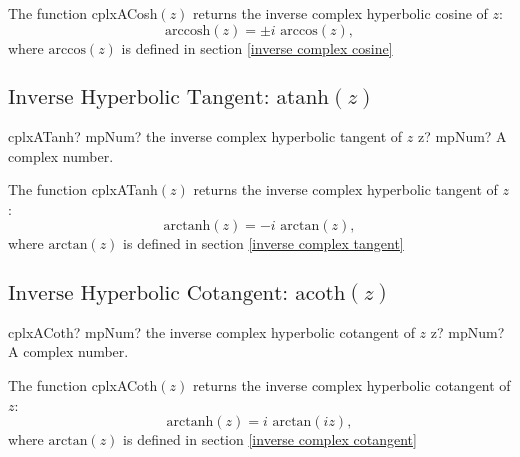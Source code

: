 \vspace{0.3cm}
The function \textsf{cplxACosh$(z)$} returns the inverse complex hyperbolic cosine of $z$: 
\begin{equation}
	\text{arccosh}(z) = \pm i \text{ arccos}(z),
\end{equation}
where $\text{arccos}(z)$ is defined in section \ref{inverse complex cosine}




\newpage
\subsection{\texorpdfstring{$\text{Inverse Hyperbolic Tangent: atanh}(z)$}{atanh}}

\begin{mpFunctionsExtract}
	\mpFunctionOne
	{cplxATanh? mpNum? the inverse complex hyperbolic tangent of $z$}
	{z? mpNum? A complex number.}
\end{mpFunctionsExtract}

\vspace{0.3cm}
The function \textsf{cplxATanh$(z)$} returns the inverse complex hyperbolic tangent of $z$: 
\begin{equation}
	\text{arctanh}(z) = -i \text{ arctan}(z),
\end{equation}
where $\text{arctan}(z)$ is defined in section \ref{inverse complex tangent}






\newpage
\subsection{\texorpdfstring{$\text{Inverse Hyperbolic Cotangent: acoth}(z)$}{acoth}}
\label{inverse complex hyperbolic cotangent}

\begin{mpFunctionsExtract}
	\mpFunctionOne
	{cplxACoth? mpNum? the inverse complex hyperbolic cotangent of $z$}
	{z? mpNum? A complex number.}
\end{mpFunctionsExtract}

\vspace{0.3cm}
The function \textsf{cplxACoth$(z)$} returns the inverse complex hyperbolic cotangent of $z$: 
\begin{equation}
	\text{arctanh}(z) = i \text{ arctan}(iz),
\end{equation}
where $\text{arctan}(z)$ is defined in section \ref{inverse complex cotangent}






